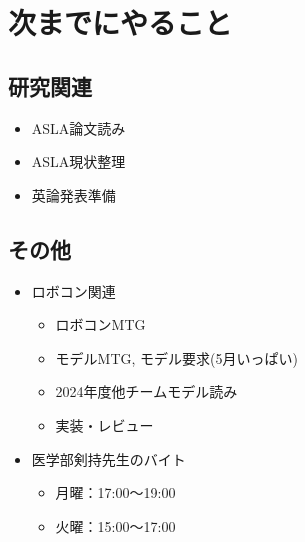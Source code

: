 \documentclass[uplatex, onecolumn, 10pt]{jsarticle}
\begin{document}
\section{次までにやること}

\subsection*{研究関連}
\begin{itemize}
	\item ASLA論文読み
	\item ASLA現状整理
	\item 英論発表準備
\end{itemize}

\subsection*{その他}
\begin{itemize}
    \item ロボコン関連
	\begin{itemize}
		\item ロボコンMTG
		\item モデルMTG, モデル要求(5月いっぱい)
		\item 2024年度他チームモデル読み
		\item 実装・レビュー
	\end{itemize}
    \item 医学部剣持先生のバイト
    \begin{itemize}
		\item 月曜：17:00～19:00
		\item 火曜：15:00～17:00
	\end{itemize}
\end{itemize}
\end{document}
